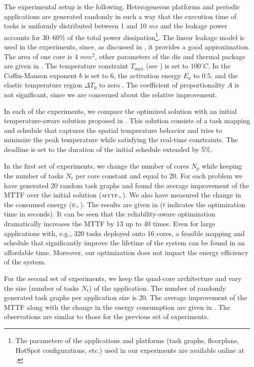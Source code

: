 The experimental setup is the following. Heterogeneous platforms and periodic applications are generated randomly \cite{dick1998} in such a way that the execution time of tasks is uniformly distributed between 1 and 10 $ms$ and the leakage power accounts for 30--60\% of the total power dissipation\footnote{The parameters of the applications and platforms (task graphs, floorplans, HotSpot configurations, etc.) used in our experiments are available online at \cite{liu2011}.}. The linear leakage model is used in the experiments, since, as discussed in , it provides a good approximation. The area of one core is 4 $mm^2$, other parameters of the die and thermal package are given in . The temperature constraint $T_\text{max}$ (see ) is set to $100^\circ C$. In  the Coffin-Manson exponent $b$ is set to 6, the activation energy $E_a$ to 0.5, and the elastic temperature region $\Delta T_0$ to zero \cite{jedec2010}. The coefficient of proportionality $A$ is not significant, since we are concerned about the relative improvement.

In each of the experiments, we compare the optimized solution with an initial temperature-aware solution proposed in \cite{xie2006}. This solution consists of a task mapping and schedule that captures the spatial temperature behavior and tries to minimize the peak temperature while satisfying the real-time constraints. The deadline is set to the duration of the initial schedule extended by 5\%.

In the first set of experiments, we change the number of cores $N_p$ while keeping the number of tasks $N_t$ per core constant and equal to 20. For each problem we have generated 20 random task graphs and found the average improvement of the MTTF over the initial solution ($\scriptstyle \text{MTTF}_\times$). We also have measured the change in the consumed energy ($\scriptstyle \text{E}_\times$). The results are given in  ($t$ indicates the optimization time in seconds). It can be seen that the reliability-aware optimization dramatically increases the MTTF by 13 up to 40 times. Even for large applications with, e.g., 320 tasks deployed onto 16 cores, a feasible mapping and schedule that significantly improve the lifetime of the system can be found in an affordable time. Moreover, our optimization does not impact the energy efficiency of the system.

For the second set of experiments, we keep the quad-core architecture and vary the size (number of tasks $N_t$) of the application. The number of randomly generated task graphs per application size is 20. The average improvement of the MTTF along with the change in the energy consumption are given in . The observations are similar to those for the previous set of experiments.

